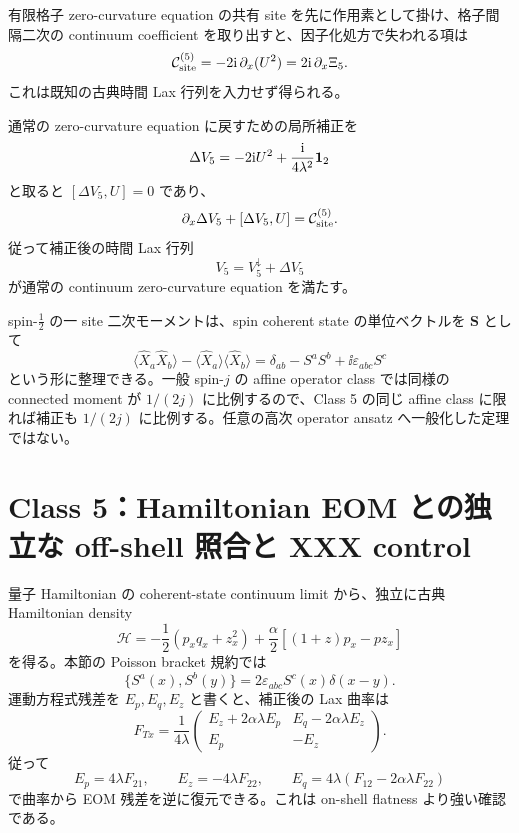 有限格子 zero-curvature equation の共有 site を先に作用素として掛け、格子間隔二次の continuum coefficient を取り出すと、因子化処方で失われる項は
\begin{equation}
\mathcal C_{\rm site}^{(5)}=-2\mathrm i\,\partial_x(U^2)=2\mathrm i\,\partial_x\Xi_5.
\label{eq:Csite5}
\end{equation}
これは既知の古典時間 Lax 行列を入力せず得られる。

通常の zero-curvature equation に戻すための局所補正を
\begin{equation}
\Delta V_5=-2\mathrm i U^2+\frac{\mathrm i}{4\lambda^2}\mathbf 1_{2}
\label{eq:DeltaV5}
\end{equation}
と取ると $[\Delta V_5,U]=0$ であり、
\begin{equation}
\partial_x\Delta V_5+[\Delta V_5,U]=\mathcal C_{\rm site}^{(5)}.
\end{equation}
従って補正後の時間 Lax 行列
\begin{equation}
V_5=V_5^\downarrow+\Delta V_5
\label{eq:V5corr}
\end{equation}
が通常の continuum zero-curvature equation を満たす。

spin-$\tfrac12$ の一 site 二次モーメントは、spin coherent state の単位ベクトルを $\boldsymbol S$ として
\begin{equation}
\langle\widehat X_a\widehat X_b\rangle-\langle\widehat X_a\rangle\langle\widehat X_b\rangle
=\delta_{ab}-S^aS^b+\ii\varepsilon_{abc}S^c
\label{eq:spinhalf2nd}
\end{equation}
という形に整理できる。一般 spin-$j$ の affine operator class では同様の connected moment が $1/(2j)$ に比例するので、Class 5 の同じ affine class に限れば補正も $1/(2j)$ に比例する。任意の高次 operator ansatz へ一般化した定理ではない。

\section{Class 5：Hamiltonian EOM との独立な off-shell 照合と XXX control}
量子 Hamiltonian の coherent-state continuum limit から、独立に古典 Hamiltonian density
\begin{equation}
\mathcal H=-\frac12(p_xq_x+z_x^2)
+\frac\alpha2\left[(1+z)p_x-pz_x\right]
\label{eq:C5Hind}
\end{equation}
を得る。本節の Poisson bracket 規約では
\begin{equation}
\{S^a(x),S^b(y)\}=2\varepsilon_{abc}S^c(x)\delta(x-y).
\label{eq:C5PB2}
\end{equation}
運動方程式残差を $E_p,E_q,E_z$ と書くと、補正後の Lax 曲率は
\begin{equation}
F_{Tx}=\frac1{4\lambda}
\begin{pmatrix}
E_z+2\alpha\lambda E_p&E_q-2\alpha\lambda E_z\\
E_p&-E_z
\end{pmatrix}.
\label{eq:C5OffInd}
\end{equation}
従って
\begin{equation}
E_p=4\lambda F_{21},\qquad
E_z=-4\lambda F_{22},\qquad
E_q=4\lambda(F_{12}-2\alpha\lambda F_{22})
\label{eq:C5InverseInd}
\end{equation}
で曲率から EOM 残差を逆に復元できる。これは on-shell flatness より強い確認である。

